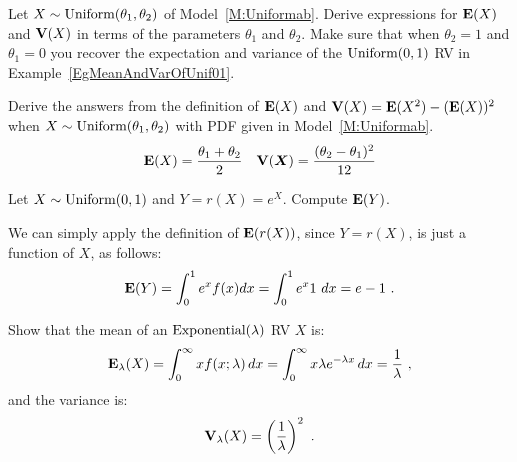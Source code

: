 \begin{Exercise}[title={Mean and variance of $\uniform(\theta_1,\theta_2)$ RV},label={xMeanAndVarOfUniformab}]
Let $X \sim \mbox{{\rm Uniform}}(\theta_1,\theta_2)$ of Model~\ref{M:Uniformab}. Derive expressions for $\mathbf{E}(X)$ and $\mathbf{V}(X)$ in terms of the parameters $\theta_1$ and $\theta_2$. Make sure that when $\theta_2=1$ and $\theta_1=0$ you recover the expectation and variance of the $\mbox{{\rm Uniform}}(0,1)$ RV in Example~\ref{EgMeanAndVarOfUnif01}.
\end{Exercise}
\begin{Answer}
Derive the answers from the definition of $\mathbf{E}(X)$ and $\mathbf{V}(X) = \mathbf{E}(X^2) - (\mathbf{E}(X))^2$ when $X \sim \mbox{{\rm Uniform}}(\theta_1,\theta_2)$ with PDF given in Model~\ref{M:Uniformab}.
\[\e(X) = \frac{\theta_1+\theta_2}{2} \quad \V(\X) = \frac{(\theta_2-\theta_1)^2}{12}\]
\end{Answer}

\begin{example}\label{EgExpectedExponentialOfUniform01}
Let $X \sim \mbox{{\rm Uniform}}(0,1)$ and $Y=r(X)=e^X$.  Compute $\mathbf{E}(Y)$. 

We can simply apply the definition of $\mathbf{E}(r(X))$, since $Y=r(X)$, is just a function of $X$, as follows: 
\[
\mathbf{E}(Y) = \int_0^1 e^x f(x) dx = \int_0^1 e^x 1 \ dx = e-1 \ .
\]
\end{example}

\begin{example}\label{EgmeanAndVarOfExponential}
Show that the mean of an $\mbox{{\rm Exponential}}(\lambda)$ RV $X$ is:
\[
\mathbf{E}_{\lambda}(X) = \int_{0}^{\infty} x f(x;\lambda)\,dx
=   \int_{0}^{\infty} x \lambda e^{-\lambda x}\,dx
= \frac{1}{\lambda} \ ,
\]
and the variance is:
\[
\mathbf{V}_{\lambda}(X) = \left(  \frac{1}{\lambda} \right)^2 \ .
\]
\end{example}

